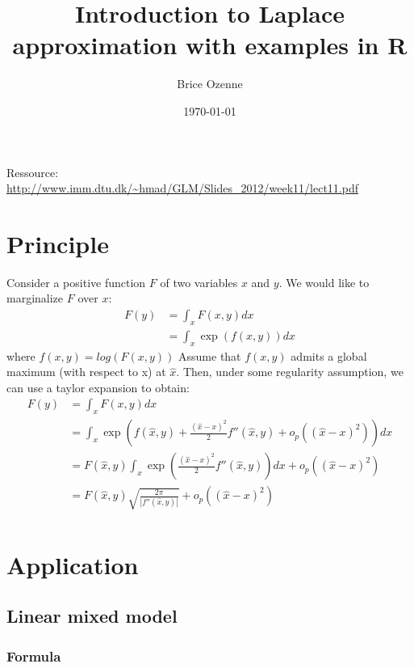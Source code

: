 \documentclass[12pt]{article}
\author{Brice Ozenne}
\date{\today}
\title{Introduction to Laplace approximation with examples in R}
\begin{document}
\maketitle
Ressource: \url{http://www.imm.dtu.dk/\~hmad/GLM/Slides\_2012/week11/lect11.pdf}


\section{Principle}
\label{sec:orgde8c156}

Consider a positive function \(F\) of two variables \(x\) and \(y\). We would
like to marginalize \(F\) over \(x\):
\begin{align*}
F(y) &= \int_x F(x,y) dx \\
&= \int_x \exp( f(x,y) ) dx
\end{align*}
where \(f(x,y)=log(F(x,y))\) Assume that \(f(x,y)\) admits a global
maximum (with respect to x) at \(\hat{x}\). Then, under some
regularity assumption, we can use a taylor expansion to obtain:
\begin{align*}
F(y) &= \int_x F(x,y) dx \\
&= \int_x \exp\left( f(\hat{x},y) + \frac{(\hat{x}-x)^2}{2} f''(\hat{x},y) + o_p\left((\hat{x}-x)^2\right) \right) dx \\
&= F(\hat{x},y)  \int_x \exp\left( \frac{(\hat{x}-x)^2}{2} f''(\hat{x},y)\right)  dx + o_p\left((\hat{x}-x)^2\right) \\
&= F(\hat{x},y)  \sqrt{\frac{2\pi}{|f''(\hat{x},y)|}} + o_p\left((\hat{x}-x)^2\right) \\
\end{align*}

\clearpage

\section{Application}
\label{sec:orgfa2b09f}

\subsection{Linear mixed model}
\label{sec:orgaf1f044}

\subsubsection{Formula}
\label{sec:orga33e853}
\end{document}
